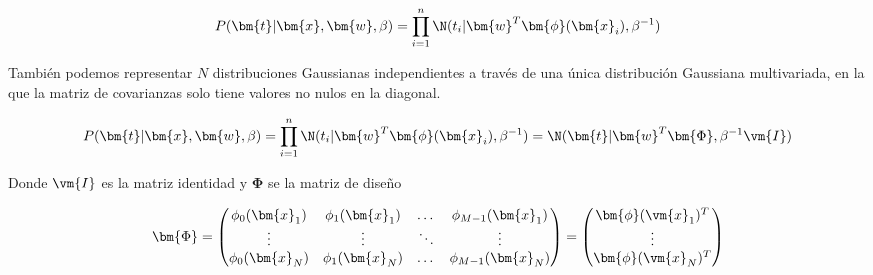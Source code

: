 \documentclass[a4paper,10pt]{article}
\begin{document}
\begin{equation}
P(\bm{t} | \bm{x}, \bm{w}, \beta) = \prod_{i=1}^n \N(t_i | \bm{w}^T \bm{\phi}(\bm{x}_i) , \beta^{-1})
\end{equation}

% 
% 
% 
%     
%     
%       

Tambi\'en podemos representar $N$ distribuciones Gaussianas independientes a trav\'es de una \'unica distribuci\'on Gaussiana multivariada, en la que la matriz de covarianzas solo tiene valores no nulos en la diagonal.

\begin{equation}
P(\bm{t} | \bm{x}, \bm{w}, \beta) = \prod_{i=1}^n \N(t_i | \bm{w}^T \bm{\phi}(\bm{x}_i) , \beta^{-1}) = \N(\bm{t}|\bm{w}^T \bm{\Phi}, \beta^{-1} \vm{I})
\end{equation}

Donde $\vm{I}$ es la matriz identidad y $\bm{\Phi}$ se la matriz de diseño

\begin{equation}
 \bm{\Phi} =
  \begin{pmatrix}
    \phi_0(\bm{x}_1) & \phi_1(\bm{x}_1) & \dots & \phi_{M-1}(\bm{x}_1)\\
    \vdots & \vdots & \ddots & \vdots \\
    \phi_0(\bm{x}_N) & \phi_1(\bm{x}_N) & \dots & \phi_{M-1}(\bm{x}_N)
  \end{pmatrix}
  = 
  \begin{pmatrix}
   \bm{\phi}(\vm{x}_1)^T \\
   \vdots \\
   \bm{\phi}(\vm{x}_N)^T \\
  \end{pmatrix}
\end{equation}
\end{document}
